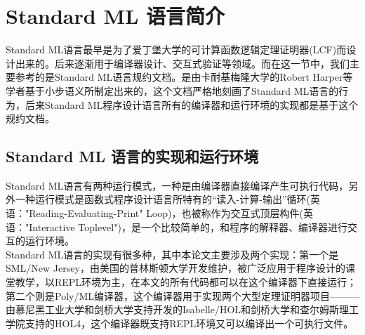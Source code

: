 \documentclass[openany,oneside]{book}
\theoremstyle{definition}
\theoremstyle{definition}
\begin{document}
	

	


\section{Standard ML 语言简介}
	Standard ML语言最早是为了爱丁堡大学的可计算函数逻辑定理证明器(LCF)而设计出来的。后来逐渐用于编译器设计、交互式验证等领域。而在这一节中，我们主要参考的是Standard ML语言规约文档\cite{harper1986standard}。是由卡耐基梅隆大学的Robert Harper等学者基于小步语义所制定出来的，这个文档严格地刻画了Standard ML语言的行为，后来Standard ML程序设计语言所有的编译器和运行环境的实现都是基于这个规约文档。 


\subsection{Standard ML 语言的实现和运行环境}
	Standard ML语言有两种运行模式，一种是由编译器直接编译产生可执行代码，另外一种运行模式是函数式程序设计语言所特有的“读入-计算-输出”循环(英语："Reading-Evaluating-Print" Loop)，也被称作为交互式顶层构件(英语："Interactive Toplevel")，是一个比较简单的，和程序的解释器、编译器进行交互的运行环境\cite{abelson1996structure}。\\
	\indent Standard ML语言的实现有很多种，其中本论文主要涉及两个实现：第一个是SML/New Jersey，由美国的普林斯顿大学开发维护，被广泛应用于程序设计的课堂教学，以REPL环境为主，在本文的所有代码都可以在这个编译器下直接运行；第二个则是Poly/ML编译器，这个编译器用于实现两个大型定理证明器项目———由慕尼黑工业大学和剑桥大学支持开发的Isabelle/HOL和剑桥大学和查尔姆斯理工学院支持的HOL4，这个编译器既支持REPL环境又可以编译出一个可执行文件。
\end{document}
